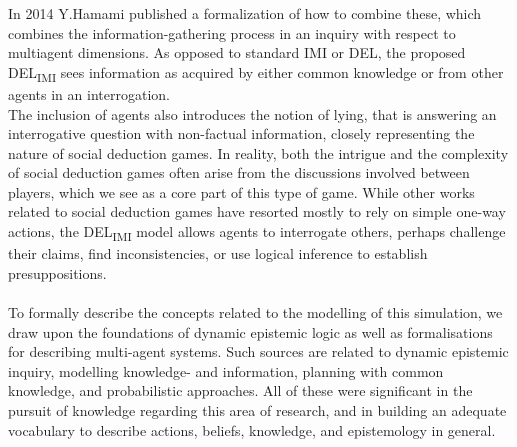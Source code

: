 In 2014 Y.Hamami\cite{delimi} published a formalization of how to combine
these, which combines the information-gathering process in an inquiry with
respect to multiagent dimensions. As opposed to standard IMI or DEL, the
proposed DEL\textsubscript{IMI} sees information as acquired by either common knowledge or from
other agents in an interrogation. \\ The inclusion of agents also introduces
the notion of lying, that is answering an interrogative question with
non-factual information, closely representing the nature of social deduction
games. In reality, both the intrigue and the complexity of social deduction
games often arise from the discussions involved between players, which we see
as a core part of this type of game. While other works related to social
deduction games have resorted mostly to rely on simple one-way actions, the
DEL\textsubscript{IMI} model allows agents to interrogate others, perhaps challenge their
claims, find inconsistencies, or use logical inference to establish
presuppositions.\\ \\ To formally describe the concepts related to the
modelling of this simulation, we draw upon the foundations of dynamic epistemic logic as well as 
formalisations for describing multi-agent systems. Such sources are related to
dynamic epistemic inquiry\cite{delimi}, modelling knowledge- and
information\cite{modelling_multi_agent_epistemic_systems}, planning with common
knowledge\cite{multi_agent_epistemic_planner_common_knowledge}, and
probabilistic approaches\cite{probibalistic_multiagent_systems}. All of these
were significant in the pursuit of knowledge regarding this area of research,
and in building an adequate vocabulary to describe actions, beliefs, knowledge,
and epistemology in general.